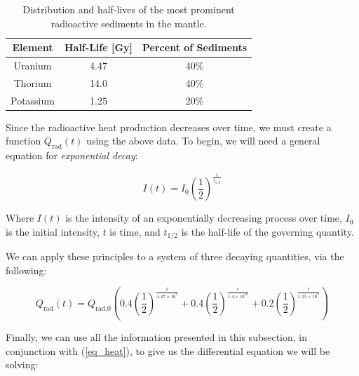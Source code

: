 \documentclass[a4paper,10pt,english]{article}
\begin{document}
\begin{table}[H]
\center
\begin{tabular}{|c|cc|}
\hline
Element & Half-Life [Gy] & Percent of Sediments \\
\hline
Uranium & 4.47 & 40\% \\
Thorium & 14.0 & 40\% \\
Potassium & 1.25 & 20\%\\
\hline
\end{tabular}
\caption{Distribution and half-lives of the most prominent radioactive sediments in the mantle. \label{table_2}}
\end{table}

Since the radioactive heat production decreases over time, we must create a function $Q_\text{rad}(t)$ using the above data.  To begin, we will need a general equation for \textit{exponential decay}:

\begin{equation*}
I(t) = I_0 \left( \frac{1}{2} \right)^{\tfrac{t}{t_{1/2}}}
\end{equation*}

Where $I(t)$ is the intensity of an exponentially decreasing process over time, $I_0$ is the initial intensity, $t$ is time, and $t_{1/2}$ is the half-life of the governing quantity.

We can apply these principles to a system of three decaying quantities, via the following:

\begin{equation*}
Q_\text{rad}(t) = Q_\text{rad,0} \left( 0.4 \left( \frac{1}{2} \right)^{\tfrac{t}{4.47 \times 10^9}} + 0.4 \left( \frac{1}{2} \right)^{\tfrac{t}{1.4 \times 10^{10}}} + 0.2 \left( \frac{1}{2} \right)^{\tfrac{t}{1.25 \times 10^9}} \right)
\end{equation*}

Finally, we can use all the information presented in this subsection, in conjunction with (\ref{eq_heat}), to give us the differential equation we will be solving:
\end{document}
